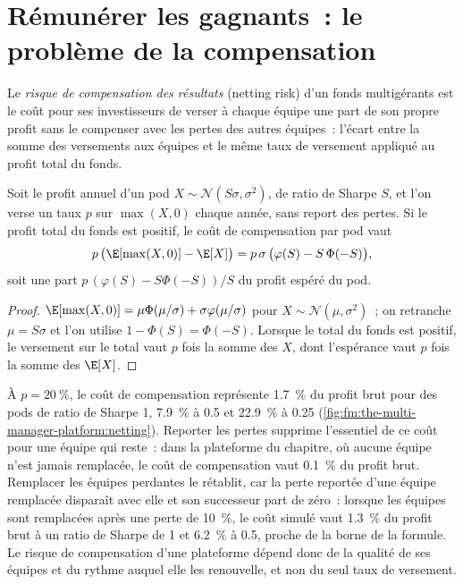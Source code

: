 \section{Rémunérer les gagnants~: le problème de la compensation}

\begin{definition}\label{def:fm:the-multi-manager-platform:netting}
Le \emph{risque de compensation des résultats} (netting risk) d'un fonds multigérants est le coût pour ses investisseurs de verser à chaque équipe une part de son propre profit
sans le compenser avec les pertes des autres équipes~: l'écart entre la somme des versements aux équipes et le même taux de versement appliqué au
profit total du fonds.
\end{definition}

\begin{proposition}\label{prop:fm:the-multi-manager-platform:netting}
Soit le profit annuel d'un pod $X\sim\mathcal N(S\sigma,\sigma^2)$, de ratio de Sharpe $S$, et l'on verse un taux $p$ sur $\max(X,0)$ chaque année, sans
report des pertes. Si le profit total du fonds est positif, le coût de compensation par pod vaut
\[
p\,\bigl(\E[\max(X,0)]-\E[X]\bigr)=p\,\sigma\,\bigl(\varphi(S)-S\,\Phi(-S)\bigr),
\]
soit une part $p\,(\varphi(S)-S\Phi(-S))/S$ du profit espéré du pod.
\end{proposition}

\begin{proof}
$\E[\max(X,0)]=\mu\Phi(\mu/\sigma)+\sigma\varphi(\mu/\sigma)$ pour $X\sim\mathcal N(\mu,\sigma^2)$~; on retranche $\mu=S\sigma$ et l'on utilise
$1-\Phi(S)=\Phi(-S)$. Lorsque le total du fonds est positif, le versement sur le total vaut $p$ fois la somme des $X$, dont l'espérance vaut $p$ fois
la somme des $\E[X]$.
\end{proof}

À $p=20~\%$, le coût de compensation représente 1.7~\% du profit brut pour des pods de ratio de Sharpe 1, 7.9~\% à 0.5 et 22.9~\% à 0.25
(\cref{fig:fm:the-multi-manager-platform:netting}). Reporter les pertes supprime l'essentiel de ce coût pour une équipe qui reste~: dans la plateforme du chapitre,
où aucune équipe n'est jamais remplacée, le coût de compensation vaut 0.1~\% du profit brut. Remplacer les équipes perdantes le rétablit, car la perte reportée d'une équipe remplacée disparaît
avec elle et son successeur part de zéro~: lorsque les équipes sont remplacées après une perte de 10~\%, le coût simulé vaut 1.3~\% du profit brut à un ratio de Sharpe de
1 et 6.2~\% à 0.5, proche de la borne de la formule. Le risque de compensation d'une plateforme dépend donc de la qualité de ses équipes et du rythme auquel elle
les renouvelle, et non du seul taux de versement.

